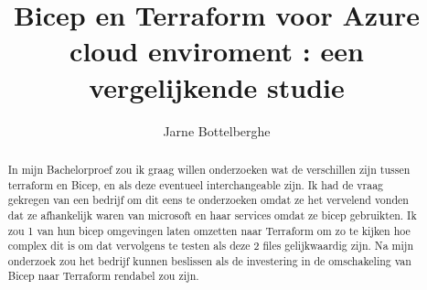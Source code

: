 \documentclass{hogent-article}
\title{Bicep en Terraform voor Azure cloud enviroment : een vergelijkende studie}
\author{Jarne Bottelberghe}
\begin{document}
\begin{abstract} 
  In mijn Bachelorproef zou ik graag willen onderzoeken wat de verschillen zijn tussen terraform en Bicep, en als deze eventueel interchangeable zijn. Ik had de vraag gekregen van een bedrijf om dit eens te onderzoeken omdat ze het vervelend vonden dat ze afhankelijk waren van microsoft en haar services omdat ze bicep gebruikten. Ik zou 1 van hun bicep omgevingen laten omzetten naar Terraform om zo te kijken hoe complex dit is om dat vervolgens te testen als deze 2 files gelijkwaardig zijn.
  Na mijn onderzoek zou het bedrijf kunnen beslissen als de investering in de omschakeling van Bicep naar Terraform rendabel zou zijn.
\end{abstract}


\tableofcontents



\printbibliography[heading=bibintoc]
\end{document}
